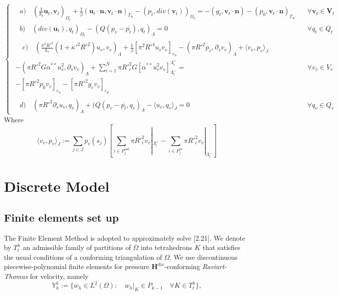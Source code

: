 \documentclass[a4paper]{report}
\begin{document}
\begin{equation}
\begin{cases}
\quad a)\quad (\frac{1}{k_t} \mathbf{u}_t, \mathbf{v}_t)_{\Omega_t}+\frac{1}{\beta}(\mathbf{u}_t \cdot \mathbf{n}, \mathbf{v}_t \cdot \mathbf{n})_{\Gamma_u}-(p_t,div(\mathbf{v}_t))_{\Omega_t}= - (g_t, \mathbf{v}_t \cdot \mathbf{n})-(p_0,\mathbf{v}_t \cdot \mathbf{n})_{\Gamma_u} \quad & \forall \mathbf{v}_t \in \mathbf{V}_t \\
\quad b)\quad (div(\mathbf{u}_t),q_t)_{\Omega_t} - (Q(p_v-\overline{p_t}),q_t)_{\Lambda}=0 \quad & \forall q_t \in Q_t \\

\begin{split}
 \quad c)\quad(\frac{\pi^2 R'^4}{k_v} (1+\kappa'^2 R'^2) u_v,v_v   )_{\Lambda} + \frac{1}{\beta}[\pi^2 R'^4 u_v v_v]_{\varepsilon_u}-(\pi R'^2 p_v, \partial_s v_v)_{\Lambda}+\langle  v_v, p_v    \rangle_J\\
- (\pi R'^2 G \alpha^{**} u_v^2,\partial_s v_v)_{\Lambda} +\sum^N_{i=1}\pi R'^2_i G [\alpha^{**} u_v^2 v_v]^{\Lambda_i^+}_{\Lambda_i^-}=\\ -[\pi R'^2 p_0 v_v]_{\varepsilon_u}-[\pi R'^2 g_v v_v]_{\varepsilon_p}\quad 
\end{split}& \forall v_v \in V_v\\
\quad d)\quad (\pi R'^2 \partial_s u_v, q_v)_{\Lambda}+ (Q(p_v-\overline{p_t},q_v)_{\Lambda}- \langle u_v, q_v \rangle_J =0 \quad & \forall q_v \in Q_v
\end{cases}
\end{equation}
Where
\begin{equation*}
\langle v_v, p_v \rangle_J:=\sum_{j \in J}p_v(s_j)[\sum_{i \in P^{out}_j} \pi R'^2_i v_v |_{\Lambda^+_i}-\sum_{i \in P^{in}_j} \pi R'^2_i v_v |_{\Lambda^-_i}]
\end{equation*}




\newpage
\chapter{Discrete Model}
\section{Finite elements set up}
The Finite Element Method is adopted to approximately solve [2.21]. We denote by $T^h_t$  an admissible family of partitions of $\overline{\Omega}$ into tetrahedrons $K$ that satisfies the usual conditions of a conforming triangulation of $\Omega$. We use discontinuous piecewise-polynomial finite elements for pressure $\mathbf{H}^{div}$-conforming {\it Raviart-Thomas} for velocity, namely
\begin{equation}
\mathbb{Y}^k_h :=\{w_h \in L^2(\Omega):\quad w_h|_K \in \mathit{P}_{k-1}\quad \forall K \in T_t^h                     \},
\end{equation}
\end{document}
